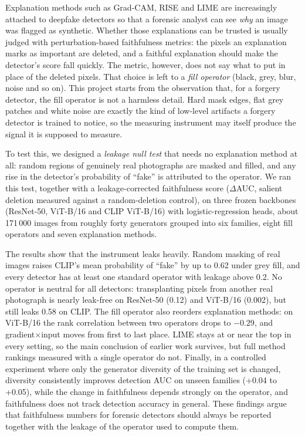 Explanation methods such as Grad-CAM, RISE and LIME are increasingly attached
to deepfake detectors so that a forensic analyst can see \emph{why} an image was
flagged as synthetic. Whether those explanations can be trusted is usually
judged with perturbation-based faithfulness metrics: the pixels an explanation
marks as important are deleted, and a faithful explanation should make the
detector's score fall quickly. The metric, however, does not say what to put
in place of the deleted pixels. That choice is left to a \emph{fill operator}
(black, grey, blur, noise and so on). This project starts from the observation
that, for a forgery detector, the fill operator is not a harmless detail. Hard
mask edges, flat grey patches and white noise are exactly the kind of
low-level artifacts a forgery detector is trained to notice, so the measuring
instrument may itself produce the signal it is supposed to measure.

To test this, we designed a \emph{leakage null test} that needs no explanation
method at all: random regions of genuinely real photographs are masked and
filled, and any rise in the detector's probability of ``fake'' is attributed to
the operator. We ran this test, together with a leakage-corrected faithfulness
score ($\Delta$AUC, salient deletion measured against a random-deletion
control), on three frozen backbones (ResNet-50, ViT-B/16 and CLIP ViT-B/16)
with logistic-regression heads, about 171\,000 images from roughly forty
generators grouped into six families, eight fill operators and seven
explanation methods.

The results show that the instrument leaks heavily. Random masking of real
images raises CLIP's mean probability of ``fake'' by up to 0.62 under grey
fill, and every detector has at least one standard operator with leakage above
0.2. No operator is neutral for all detectors: transplanting pixels from
another real photograph is nearly leak-free on ResNet-50 (0.12) and ViT-B/16
(0.002), but still leaks 0.58 on CLIP. The fill operator also reorders
explanation methods: on ViT-B/16 the rank correlation between two operators
drops to $-0.29$, and gradient$\times$input moves from first to last place.
LIME stays at or near the top in every setting, so the main conclusion of
earlier work survives, but full method rankings measured with a single
operator do not. Finally, in a controlled experiment where only the generator
diversity of the training set is changed, diversity consistently improves
detection AUC on unseen families (+0.04 to +0.05), while the change in
faithfulness depends strongly on the operator, and faithfulness does not track
detection accuracy in general. These findings argue that faithfulness numbers
for forensic detectors should always be reported together with the leakage of
the operator used to compute them.

\vspace{0.5cm}

